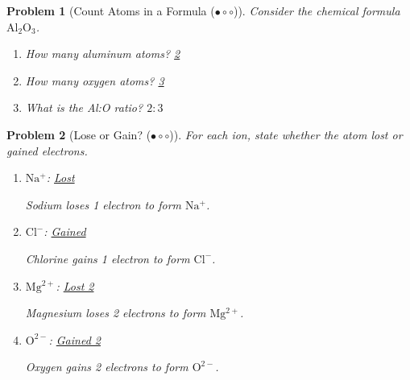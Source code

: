 \documentclass[a4paper,11pt]{article}
\newcommand{\easy}{(\ensuremath{\bullet \circ \circ})}
\theoremstyle{listprobstyle}
\newtheorem{problem}{Problem}
\newenvironment{solution}
    {\par\begingroup\color{BrickRed}}
    {\par\endgroup}
\begin{document}
\begin{problem}[Count Atoms in a Formula \easy]
Consider the chemical formula $\mathrm{Al_2O_3}$.
\vspace{-0.6\baselineskip}
\begin{enumerate}[label=\alph*),itemsep=0pt,parsep=0pt,topsep=0pt]
\item How many aluminum atoms?
    \underline{\textcolor{BrickRed}{\phantom{X}2\phantom{X}}}
\vspace{0.5\baselineskip}
\item How many oxygen atoms?
    \underline{\textcolor{BrickRed}{\phantom{X}3\phantom{X}}}
\vspace{0.5\baselineskip}
\item What is the Al:O ratio?
    \underline{\textcolor{BrickRed}{\phantom{X}$2:3$\phantom{X}}}
\end{enumerate}
\end{problem}


\begin{problem}[Lose or Gain? \easy]
For each ion, state whether the atom lost or gained electrons.
\vspace{-0.6\baselineskip}
\begin{enumerate}[label=\alph*),itemsep=0pt,parsep=0pt,topsep=0pt]
\item $\mathrm{Na^+}$:
    \underline{\textcolor{BrickRed}{Lost}}
    \begin{solution}
    Sodium loses 1 electron to form $\mathrm{Na^+}$.
    \end{solution}
\vspace{0.5\baselineskip}
\item $\mathrm{Cl^-}$:
    \underline{\textcolor{BrickRed}{Gained}}
    \begin{solution}
    Chlorine gains 1 electron to form $\mathrm{Cl^-}$.
    \end{solution}
\vspace{0.5\baselineskip}
\item $\mathrm{Mg^{2+}}$:
    \underline{\textcolor{BrickRed}{Lost 2}}
    \begin{solution}
    Magnesium loses 2 electrons to form $\mathrm{Mg^{2+}}$.
    \end{solution}
\vspace{0.5\baselineskip}
\item $\mathrm{O^{2-}}$:
    \underline{\textcolor{BrickRed}{Gained 2}}
    \begin{solution}
    Oxygen gains 2 electrons to form $\mathrm{O^{2-}}$.
\end{solution}
\end{enumerate}
\end{problem}
\end{document}
